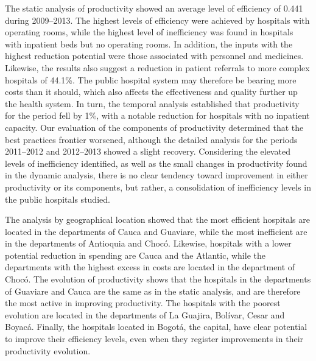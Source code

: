 \documentclass[11pt,a4paper,oneside]{article}
\begin{document}
The static analysis of productivity showed an average level of efficiency of 0.441 during 2009--2013. The highest levels of efficiency were achieved by hospitals with operating rooms, while the highest level of inefficiency was found in hospitals with inpatient beds but no operating rooms. In addition, the inputs with the highest reduction potential were those associated with personnel and medicines. Likewise, the results also suggest a reduction in patient referrals to more complex hospitals of 44.1\%. The public hospital system may therefore be bearing more costs than it should, which also affects the effectiveness and quality further up the health system. In turn, the temporal analysis established that productivity for the period fell by 1\%, with a notable reduction for hospitals with no inpatient capacity. Our evaluation of the components of productivity determined that the best practices frontier worsened, although the detailed analysis for the periods 2011--2012 and 2012--2013 showed a slight recovery. Considering the elevated levels of inefficiency identified, as well as the small changes in productivity found in the dynamic analysis, there is no clear tendency toward improvement in either productivity or its components, but rather, a consolidation of inefficiency levels in the public hospitals studied.


The analysis by geographical location showed that the most efficient hospitals are located in the departments of Cauca and Guaviare, while the most inefficient are in the departments of Antioquia and Choc\'o. Likewise, hospitals with a lower potential reduction in spending are Cauca and the Atlantic, while the departments with the highest excess in costs are located in the department of Choc\'o. The evolution of productivity shows that the hospitals in the departments of Guaviare and Cauca are the same as in the static analysis, and are therefore the most active in improving productivity. The hospitals with the poorest evolution are located in the departments of La Guajira, Bol\'ivar, Cesar and Boyac\'a. Finally, the hospitals located in Bogot\'a, the capital, have clear potential to improve their efficiency levels, even when they register improvements in their productivity evolution.
\end{document}

